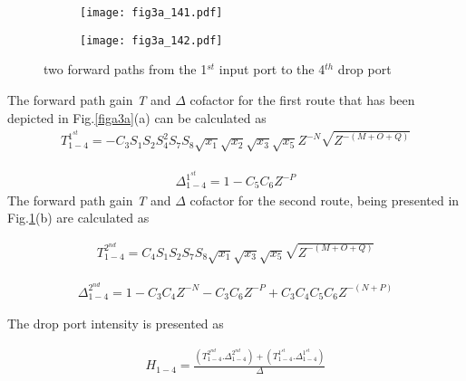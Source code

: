 \documentclass{osa-article}
\begin{document}
\begin{figure}[h!]
  \centering
    \begin{subfigure}[b]{0.4\linewidth}
    \texttt{[image: fig3a\_141.pdf]}
    \caption{}
  \end{subfigure}
  \begin{subfigure}[b]{0.4\linewidth}
    \texttt{[image: fig3a\_142.pdf]}
    \caption{}
  \end{subfigure}
  \caption{two forward paths from the 1$^{st}$ input port to the 4$^{th}$ drop port}
  \label{fig3a}
\end{figure}

The forward path gain \textit {T} and $\Delta$ cofactor for the first route that has been depicted in Fig.\ref{figa3a}(a) can be calculated as\\

\begin{equation}
\begin{split}
T^{1^{st}}_{1-4}=-C_3S_1S_2{S^2_{4}}S_7S_8\sqrt{x_1}\sqrt{x_2}\sqrt{x_3}\sqrt{x_5}Z^{-N}\sqrt{Z^{-(M+O+Q)}}
 \label{eqa51}
\end{split}
\end{equation}

\begin{equation}
\begin{split}
\Delta^{1^{st}}_{1-4}=1-C_5C_6Z^{-P}
 \label{eqa52}
\end{split}
\end{equation}
The forward path gain \textit {T} and $\Delta$ cofactor for the second route, being presented in Fig.\ref{fig3a}(b) are calculated as

\begin{equation}
\begin{split}
T^{2^{nd}}_{1-4}=C_4S_1S_2S_7S_8\sqrt{x_1}\sqrt{x_3}\sqrt{x_5}\sqrt{Z^{-(M+O+Q)}}
\end{split}
\end{equation}

\begin{equation}
\begin{split}
\Delta^{2^{nd}}_{1-4}=1-C_3C_4Z^{-N}-C_3C_6Z^{-P}+C_3C_4C_5C_6Z^{-(N+P)}
\end{split}
\end{equation}

The drop port intensity is presented as

\begin{equation}
\begin{split}
H_{1-4}=\frac{(T^{2^{nd}}_{1-4}.\Delta^{2^{nd}}_{1-4})+(T^{1^{st}}_{1-4}.\Delta^{1^{st}}_{1-4})}{\Delta}
\end{split}
\end{equation}
\end{document}
